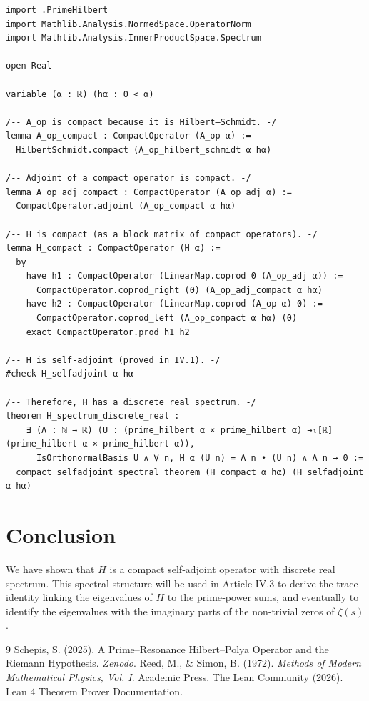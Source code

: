\documentclass[11pt,a4paper]{article}
\begin{document}
\begin{lstlisting}[style=lean, caption={SeriesIV/SelfAdjointCompact.lean}]
import .PrimeHilbert
import Mathlib.Analysis.NormedSpace.OperatorNorm
import Mathlib.Analysis.InnerProductSpace.Spectrum

open Real

variable (α : ℝ) (hα : 0 < α)

/-- A_op is compact because it is Hilbert–Schmidt. -/
lemma A_op_compact : CompactOperator (A_op α) :=
  HilbertSchmidt.compact (A_op_hilbert_schmidt α hα)

/-- Adjoint of a compact operator is compact. -/
lemma A_op_adj_compact : CompactOperator (A_op_adj α) :=
  CompactOperator.adjoint (A_op_compact α hα)

/-- H is compact (as a block matrix of compact operators). -/
lemma H_compact : CompactOperator (H α) :=
  by
    have h1 : CompactOperator (LinearMap.coprod 0 (A_op_adj α)) :=
      CompactOperator.coprod_right (0) (A_op_adj_compact α hα)
    have h2 : CompactOperator (LinearMap.coprod (A_op α) 0) :=
      CompactOperator.coprod_left (A_op_compact α hα) (0)
    exact CompactOperator.prod h1 h2

/-- H is self-adjoint (proved in IV.1). -/
#check H_selfadjoint α hα

/-- Therefore, H has a discrete real spectrum. -/
theorem H_spectrum_discrete_real :
    ∃ (Λ : ℕ → ℝ) (U : (prime_hilbert α × prime_hilbert α) →ₗ[ℝ] (prime_hilbert α × prime_hilbert α)),
      IsOrthonormalBasis U ∧ ∀ n, H α (U n) = Λ n • (U n) ∧ Λ n → 0 :=
  compact_selfadjoint_spectral_theorem (H_compact α hα) (H_selfadjoint α hα)
\end{lstlisting}

\section{Conclusion}

We have shown that $H$ is a compact self‑adjoint operator with discrete real spectrum. This spectral structure will be used in Article IV.3 to derive the trace identity linking the eigenvalues of $H$ to the prime‑power sums, and eventually to identify the eigenvalues with the imaginary parts of the non‑trivial zeros of $\zeta(s)$.


\begin{thebibliography}{9}
  Schepis, S. (2025). A Prime–Resonance Hilbert–Polya Operator and the Riemann Hypothesis. \emph{Zenodo}.
  Reed, M., \& Simon, B. (1972). \emph{Methods of Modern Mathematical Physics, Vol. I}. Academic Press.
  The Lean Community (2026). Lean 4 Theorem Prover Documentation.
\end{thebibliography}
\end{document}
